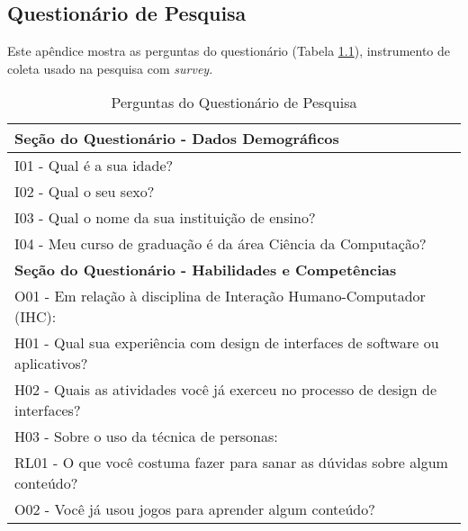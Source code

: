 \begin{apendicesenv}


\chapter{Questionário de Pesquisa}
\label{ap:questionario}

Este apêndice mostra as perguntas do questionário (Tabela \ref{tab:quest-survey}), instrumento de coleta usado na pesquisa com \textit{survey}. 

\begin{table} [!h]
\centering
\caption{Perguntas do Questionário de Pesquisa}
\label{tab:quest-survey}
\begin{tabular}{|p{16cm}|}
\hline

\textbf{Seção do Questionário - Dados Demográficos} \\ \hline

I01 - Qual é a sua idade? \\ \hline

I02 - Qual o seu sexo? \\ \hline

I03 - Qual o nome da sua instituição de ensino? \\ \hline

I04 - Meu curso de graduação é da área Ciência da Computação? \\ \hline

\textbf{Seção do Questionário - Habilidades e Competências} \\ \hline

O01 - Em relação à disciplina de Interação Humano-Computador (IHC):\\ \hline

H01 - Qual sua experiência com design de interfaces de software ou aplicativos?
\\ \hline

H02 -  Quais as atividades você já exerceu no processo de design de interfaces?
\\ \hline

H03 - Sobre o uso da técnica de personas:
\\ \hline

RL01 - O que você costuma fazer para sanar as dúvidas sobre algum conteúdo?
\\ \hline

O02 - Você já usou jogos para aprender algum conteúdo?\\ \hline


\end{tabular}
\end{table}
\end{apendicesenv}
